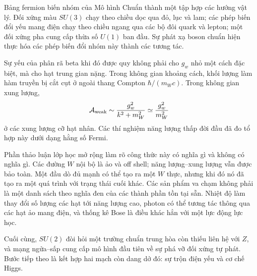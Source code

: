 Bảng fermion biến nhóm của Mô hình Chuẩn thành một tập hợp các hướng vật lý. Đối xứng màu \(SU(3)\) chạy theo chiều dọc qua đỏ, lục và lam; các phép biến đổi yếu mang điện chạy theo chiều ngang qua các bộ đôi quark và lepton; một đối xứng pha cung cấp thừa số \(U(1)\) ban đầu. Sự phát xạ boson chuẩn hiện thực hóa các phép biến đổi nhóm này thành các tương tác.

Sự yếu của phân rã beta khi đó được quy không phải cho \(g_w\) nhỏ một cách đặc biệt, mà cho hạt trung gian nặng. Trong không gian khoảng cách, khối lượng làm hàm truyền bị cắt cụt ở ngoài thang Compton \(\hbar/(m_Wc)\). Trong không gian xung lượng,
\begin{equation}
  \mathcal A_{\rm weak}
  \sim\frac{g_w^2}{k^2+m_W^2}
  \simeq\frac{g_w^2}{m_W^2}
\end{equation}
ở các xung lượng cỡ hạt nhân. Các thí nghiệm năng lượng thấp đời đầu đã đo tổ hợp này dưới dạng hằng số Fermi.

Phần thảo luận lớp học mở rộng làm rõ công thức này có nghĩa gì và không có nghĩa gì. Các đường \(W\) nội bộ là ảo và off shell; năng lượng--xung lượng vẫn được bảo toàn. Một đầu dò đủ mạnh có thể tạo ra một \(W\) thực, nhưng khi đó nó đã tạo ra một quá trình với trạng thái cuối khác. Các sản phẩm va chạm không phải là một danh sách theo nghĩa đen của các thành phần tồn tại sẵn. Nhiệt độ làm thay đổi số lượng các hạt tới năng lượng cao, photon có thể tương tác thông qua các hạt ảo mang điện, và thống kê Bose là điều khác hẳn với một lực động lực học.

Cuối cùng, \(SU(2)\) đòi hỏi một trường chuẩn trung hòa còn thiếu liên hệ với \(Z\), và mạng ngửa--sấp cung cấp mô hình đầu tiên về sự phá vỡ đối xứng tự phát. Bước tiếp theo là kết hợp hai mạch còn dang dở đó: sự trộn điện yếu và cơ chế Higgs.
